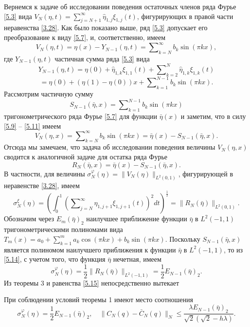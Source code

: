 Вернемся к задаче об исследовании поведения остаточных членов ряда Фурье \eqref{5.3}   вида $V_N(\eta,t)=\sum\nolimits_{j=N+1}^\infty \hat \eta_{1,j}\xi_{1,j}(t)$, фигурирующих в правой части неравенства \eqref{3.28}. Как было показано выше, ряд \eqref{5.3} допускает его преобразование к виду \eqref{5.7}, и, соответственно, имеем
\begin{equation}\label{5.9}
V_N(\eta,t)=\eta(x)-Y_{N-1}(\eta,t)= \sum\nolimits_{k=N}^\infty b_k\sin(\pi kx),
\end{equation}
где  $Y_{N-1}(\eta,t)$ частичная сумма ряда \eqref{5.3} вида
$$
Y_{N-1}(\eta,t)= \eta(0)+\hat\eta_{1,k}\xi_{1,1}(t)+ \sum\nolimits_{k=2}^N \hat \eta_{1,k}\xi_{1,k}(t)
$$
\begin{equation}\label{5.10}
= \eta(0)+(\eta(1)-\eta(0))x+\sum\nolimits_{k=1}^{N-1} b_k\sin(\pi kx).
\end{equation}
Рассмотрим частичную сумму
\begin{equation}\label{5.11}
S_{N-1}(\bar\eta,x)= \sum\nolimits_{k=1}^{N-1} b_k\sin(\pi kx)
\end{equation}
тригонометрического ряда Фурье \eqref{5.7} для функции $\bar\eta(x)$ и заметим, что в силу \eqref{5.9} -- \eqref{5.11} имеем
\begin{equation}\label{5.12}
V_N(\eta,x)= \sum\nolimits_{k=N}^{\infty} b_k\sin(\pi kx)=\bar\eta(x)-S_{N-1}(\bar\eta,x).
\end{equation}
Отсюда мы замечаем, что задача об исследовании поведения величины $V_N(\eta,x)$ сводится к аналогичной задаче для остатка ряда Фурье
\begin{equation}\label{5.13}
R_N(\bar\eta,x)= \bar\eta(x)-S_{N-1}(\bar\eta,x).
\end{equation}
В частности, для величины $\sigma_N^\varphi(\eta)=\|V_N(\eta)\|_{L^2(0,1)}$, фигурирующей в неравенстве \eqref{3.28}, имеем
\begin{equation}\label{5.14}
\sigma_N^\xi(\eta)=\left(\int_{0}^1\left(\sum\nolimits_{j=N}^\infty \hat \eta_{1,j+1}\xi_{1,j+1}(t)\right)^2 dt\right)^\frac12=\|R_N(\bar\eta)\|_{L^2(0,1)}.
\end{equation}
Обозначим через $E_m(\bar\eta)_2$ наилучшее приближение функции $\bar\eta$ в $L^2(-1,1)$ тригонометрическими полиномами вида $T_m(x)=a_0+\sum_{k=1}^{m}a_k\cos(\pi kx)+b_k\sin(\pi kx)$. Поскольку $S_{N-1}(\bar\eta,x)$ является полиномом наилучшего приближения к функции $\bar\eta$ в $L^2(-1,1)$, то из \eqref{5.14}, с учетом того, что функция $\bar\eta$ нечетная, имеем
\begin{equation}\label{5.15}
\sigma_N^\varphi(\eta)=\frac12\|R_N(\bar\eta)\|_{L^2(-1,1)}=\frac12E_{N-1}(\bar\eta)_2.
\end{equation}
Из теоремы 3 и равенства \eqref{5.15} непосредственно вытекает
\begin{theorem}
  При соблюдении условий теоремы 1 имеют место соотношения
  \begin{equation}\label{5.16}
  \sigma_N^\varphi(\eta)=\frac12E_{N-1}(\bar\eta)_2, \quad
\|C_N(q)-\bar C_N(q)\|_N\le \frac{\lambda E_{N-1}(\bar\eta)_2} {\sqrt{2}(\sqrt{2}-h\lambda)}.
\end{equation}
\end{theorem}






